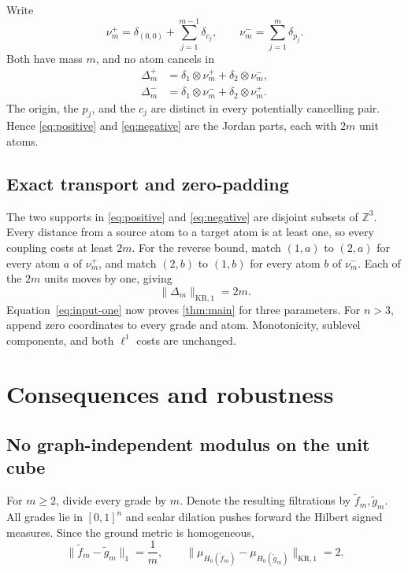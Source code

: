 \documentclass[11pt]{article}
\theoremstyle{definition}
\newcommand{\Z}{\mathbb{Z}}
\newcommand{\1}{\mathbf{1}}
\newcommand{\KR}{\mathrm{KR}}
\begin{document}
Write
\[
  \nu_m^+=\delta_{(0,0)}+\sum_{j=1}^{m-1}\delta_{c_j},
  \qquad
  \nu_m^-=\sum_{j=1}^{m}\delta_{p_j}.
\]
Both have mass $m$, and no atom cancels in
\begin{align}
  \Delta_m^+
    &=\delta_1\otimes\nu_m^+
      +\delta_2\otimes\nu_m^-,
      \label{eq:positive}\\
  \Delta_m^-
    &=\delta_1\otimes\nu_m^-
      +\delta_2\otimes\nu_m^+.
      \label{eq:negative}
\end{align}
The origin, the $p_j$, and the $c_j$ are distinct in every potentially
cancelling pair.  Hence \eqref{eq:positive} and \eqref{eq:negative} are the
Jordan parts, each with $2m$ unit atoms.

\subsection{Exact transport and zero-padding}

The two supports in \eqref{eq:positive} and \eqref{eq:negative} are disjoint
subsets of $\Z^3$.  Every distance from a source atom to a target atom is at
least one, so every coupling costs at least $2m$.  For the reverse bound, match
$(1,a)$ to $(2,a)$ for every atom $a$ of $\nu_m^+$, and match
$(2,b)$ to $(1,b)$ for every atom $b$ of $\nu_m^-$.  Each of the $2m$ units
moves by one, giving
\[
  \lVert\Delta_m\rVert_{\KR,1}=2m.
\]
Equation~\eqref{eq:input-one} now proves \cref{thm:main} for three
parameters.  For $n>3$, append zero coordinates to every grade and atom.
Monotonicity, sublevel components, and both $\ell^1$ costs are unchanged.

\section{Consequences and robustness}\label{sec:consequences}

\subsection{No graph-independent modulus on the unit cube}

For $m\geq2$, divide every grade by $m$.  Denote the resulting filtrations
by $\widetilde f_m,\widetilde g_m$.  All grades lie in $[0,1]^n$ and scalar
dilation pushes forward the Hilbert signed measures.  Since the ground
metric is homogeneous,
\begin{equation}\label{eq:unit-cube}
  \lVert\widetilde f_m-\widetilde g_m\rVert_1=\frac1m,
  \qquad
  \bigl\lVert
    \mu_{H_0(\widetilde f_m)}
    -\mu_{H_0(\widetilde g_m)}
  \bigr\rVert_{\KR,1}=2.
\end{equation}
\end{document}

